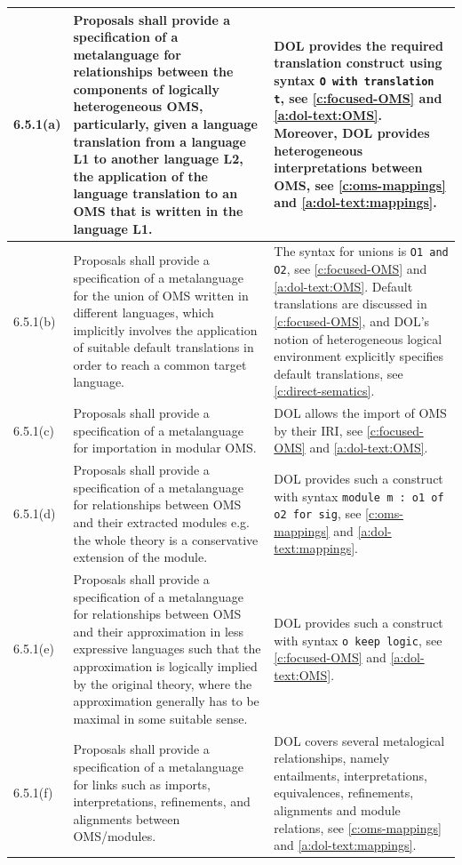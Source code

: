 \documentclass[10pt,fleqn,%
\ifpretendfinal
final%
\else
draft%
\fi,
]{scrreprt}
\newcommand*{\syntax}[1]{\texttt{#1}}
\begin{document}
\begin{center}
\begin{longtable}{|p{}|p{}|p{}|}
6.5.1(a) & 
Proposals shall provide a specification of a metalanguage for relationships between the components
of logically heterogeneous OMS, particularly, given a language translation from a language L1 to
another language L2, the application of the language translation to an OMS that is written in the
language L1. &
DOL provides the required translation construct using syntax \syntax{O with translation t}, see \ref{c:focused-OMS} and \ref{a:dol-text:OMS}.
Moreover, DOL provides heterogeneous interpretations between OMS, see \ref{c:oms-mappings} and \ref{a:dol-text:mappings}. 
   \\ \hline
%
6.5.1(b) & 
Proposals shall provide a specification of a metalanguage for the union of OMS written in
different languages, which implicitly involves the application of suitable default translations in
order to reach a common target language. &
The syntax for unions is \syntax{O1 and O2}, see \ref{c:focused-OMS} and \ref{a:dol-text:OMS}. Default translations are discussed in
\ref{c:focused-OMS}, and DOL's notion of heterogeneous logical
environment explicitly specifies default translations, see \ref{c:direct-sematics}.
	\\ \hline
%
6.5.1(c) & 
Proposals shall provide a specification of a metalanguage for importation in modular OMS.	&
DOL allows the import of OMS by their IRI, see \ref{c:focused-OMS} and \ref{a:dol-text:OMS}.
	\\  \hline
%
6.5.1(d) & 
Proposals shall provide a specification of a metalanguage for relationships between OMS and their
extracted modules e.g. the whole theory is a conservative extension of the module. 	&
DOL provides such a construct with syntax \syntax{module m : o1 of o2 for sig}, see \ref{c:oms-mappings} and \ref{a:dol-text:mappings}.
	\\ \hline
%
6.5.1(e) & 
Proposals shall provide a specification of a metalanguage for relationships between OMS and their
approximation in less expressive languages such that the approximation is logically implied by the
original theory, where the approximation generally has to be maximal in some suitable sense. 	&
DOL provides such a construct with syntax \syntax{o keep logic},  see \ref{c:focused-OMS} and \ref{a:dol-text:OMS}.	\\ \hline
%
6.5.1(f) & 
Proposals shall provide a specification of a metalanguage for links such as imports,
interpretations, refinements, and alignments between OMS/modules.
	&
DOL covers several metalogical relationships, namely entailments, interpretations, equivalences, refinements, alignments and module relations, see \ref{c:oms-mappings} and \ref{a:dol-text:mappings}.

\end{longtable}
\end{center}
\end{document}
